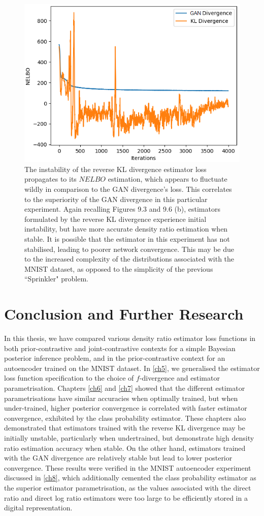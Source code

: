 \documentclass[honours,12pt]{unswthesis}
\numberwithin{equation}{section}
\theoremstyle{definition}
\begin{document}
\begin{figure}[h]
\centering
\includegraphics[width=0.49\linewidth]{part4nelbos/PCADVvsPCKLD.png}
\caption{\small The instability of the reverse KL divergence estimator loss propagates to its $NELBO$ estimation, which appears to fluctuate wildly in comparison to the GAN divergence's loss. This correlates to the superiority of the GAN divergence in this particular experiment. Again recalling Figures 9.3 and 9.6 (b), estimators formulated by the reverse KL divergence experience initial instability, but have more accurate density ratio estimation when stable. It is possible that the estimator in this experiment has not stabilised, leading to poorer network convergence. This may be due to the increased complexity of the distributions associated with the MNIST dataset, as opposed to the simplicity of the previous ``Sprinkler" problem.}
\end{figure}
\chapter{Conclusion and Further Research}\label{ch9}
In this thesis, we have compared various density ratio estimator loss functions in both prior-contrastive and joint-contrastive contexts for a simple Bayesian posterior inference problem, and in the prior-contrastive context for an autoencoder trained on the MNIST dataset. In \autoref{ch5}, we generalised the estimator loss function specification to the choice of $f$-divergence and estimator parametrisation. Chapters \ref{ch6} and \ref{ch7} showed that the different estimator parametrisations have similar accuracies when optimally trained, but when under-trained, higher posterior convergence is correlated with faster estimator convergence, exhibited by the class probability estimator. These chapters also demonstrated that estimators trained with the reverse KL divergence may be initially unstable, particularly when undertrained, but demonstrate high density ratio estimation accuracy when stable. On the other hand, estimators trained with the GAN divergence are relatively stable but lead to lower posterior convergence. These results were verified in the MNIST autoencoder experiment discussed in \autoref{ch8}, which additionally cemented the class probability estimator as the superior estimator parametrisation, as the values associated with the direct ratio and direct log ratio estimators were too large to be efficiently stored in a digital representation.
\end{document}
